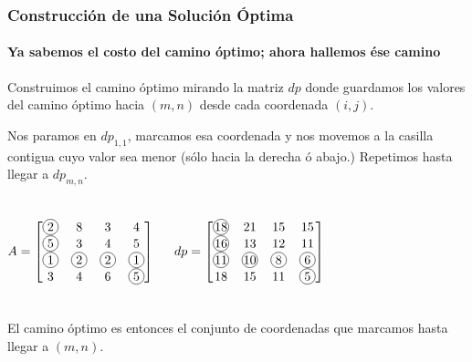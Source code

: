 \documentclass[spanish]{beamer}
\newcommand*\circledcolor[3]{\tikz[baseline=(char.base)]{
    \node[shape=circle,draw,inner sep=1pt,color=#2, #3] (char) {\hphantom{00}};
    \node[inner sep=1pt] (char) {$#1$};
}}
\newcommand*\circled[1]{\circledcolor{#1}{black}{solid}}
\begin{document}
    \begin{frame}
        \frametitle{Construcción de una Solución Óptima}
        \framesubtitle{Ya sabemos el costo del camino óptimo; ahora hallemos ése camino}

        Construimos el camino óptimo mirando la matriz $dp$ donde guardamos los valores del camino óptimo hacia $(m, n)$ desde cada coordenada $(i, j)$.

        \vspace{1em}

        Nos paramos en $dp_{1,1}$, marcamos esa coordenada y nos movemos a la casilla contigua cuyo valor sea menor (sólo hacia la derecha ó abajo.) Repetimos hasta llegar a $dp_{m,n}$.

        \begin{columns}
            $$
            A =
            \begin{bmatrix}
                \circled{2} & 8           & 3           & 4 \\
                \circled{5} & 3           & 4           & 5 \\
                \circled{1} & \circled{2} & \circled{2} & \circled{1} \\
                3           & 4           & 6           & \circled{5}
            \end{bmatrix}
            $$

            $$
            dp =
            \begin{bmatrix}
                \circled{18} & 21           & 15          & 15 \\
                \circled{16} & 13           & 12          & 11 \\
                \circled{11} & \circled{10} & \circled{8} & \circled{6} \\
                18           & 15           & 11          & \circled{5}
            \end{bmatrix}
            $$
        \end{columns}

        \vspace{1em}

        El camino óptimo es entonces el conjunto de coordenadas que marcamos hasta llegar a $(m, n)$.
    \end{frame}
\end{document}
